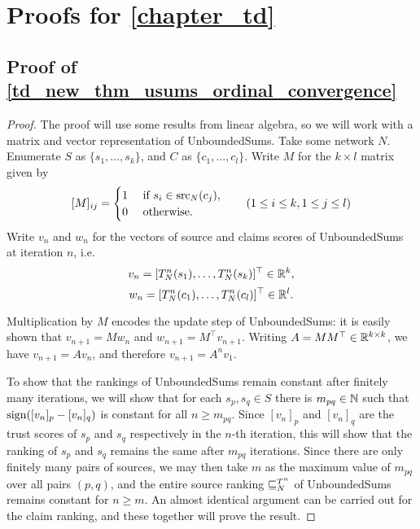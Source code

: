 \chapter{Proofs for \cref{chapter_td}}

\section{Proof of \cref{td_new_thm_usums_ordinal_convergence}}
\label{td_new_app_sec_usums}

\restatetdusumsthm*

\begin{proof}
    The proof will use some results from linear algebra, so we will work with a
    matrix and vector representation of UnboundedSums. Take some network $N$.
    Enumerate $S$ as
    $\{s_1,\ldots,s_k\}$, and $C$ as $\{c_1,\ldots,c_l\}$. Write
    $M$ for the $k \times l$ matrix given by
    \[
        [M]_{ij} = \begin{cases}
            1 & \text{ if } s_i \in \operatorname{src}_N(c_j), \\
            0 & \text{ otherwise.}
        \end{cases}
        \qquad
        (1 \le i \le k, 1 \le j \le l)
    \]
    Write $v_n$ and $w_n$ for the vectors of source and claims scores of
    UnboundedSums at iteration $n$, i.e.
    \[
        v_n = [T_N^n(s_1), \ldots, T_N^n(s_k)]^\top \in \mathbb{R}^k,
    \]
    \[
        w_n = [T_N^n(c_1), \ldots, T_N^n(c_l)]^\top \in \mathbb{R}^l.
    \]

    Multiplication by $M$ encodes the update step of UnboundedSums: it is easily
    shown that $v_{n+1} = Mw_n$ and $w_{n+1} = M^{\top}v_{n+1}$. Writing $A =
    MM^\top \in \mathbb{R}^{k \times k}$, we have $v_{n+1} = Av_n$, and therefore
    $v_{n+1} = A^n v_1$.

    To show that the rankings of UnboundedSums remain constant after finitely many
    iterations, we will show that for each $s_p, s_q \in S$ there is $m_{pq}
    \in \mathbb{N}$ such that $\operatorname{sign}([v_n]_p - [v_n]_q)$ is constant for all $n \ge
    m_{pq}$. Since $[v_n]_p$ and $[v_n]_q$ are the trust scores of $s_p$ and
    $s_q$ respectively in the $n$-th iteration, this will show that the ranking
    of $s_p$ and $s_q$ remains the same after $m_{pq}$ iterations. Since there
    are only finitely many pairs of sources, we may then take $m$ as the
    maximum value of $m_{pq}$ over all pairs $(p, q)$, and the entire source
    ranking ${\sqsubseteq_N^{T^n}}$ of UnboundedSums remains constant for $n \ge m$. An
    almost identical argument can be carried out for the claim ranking, and
    these together will prove the result.


\end{proof}
